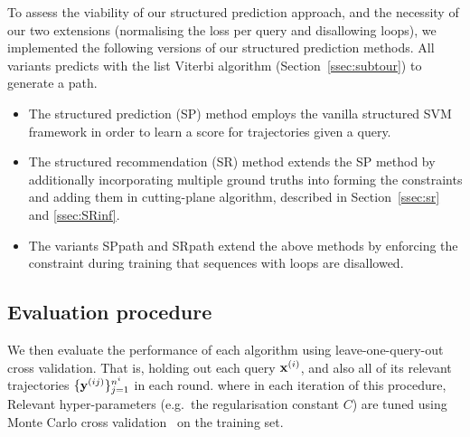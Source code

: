 To assess the viability of our structured prediction approach, and the necessity of our two extensions (normalising the loss per query and disallowing loops), we implemented the following versions of our structured prediction methods.
All variants predicts with the list Viterbi algorithm (Section~\ref{ssec:subtour}) to generate a path.
\begin{itemize}[leftmargin=0.125in]\itemmoveup
\parskip -.05em
	\item The structured prediction ({\sc SP}) method employs the vanilla structured SVM framework in order to learn a score for trajectories given a query.

	\item The structured recommendation ({\sc SR}) method extends the {\sc SP} method by additionally incorporating multiple ground truths into
	forming the constraints and adding them in cutting-plane algorithm,
	described in Section~\ref{ssec:sr} and \ref{ssec:SRinf}.

	\item The variants {\sc SPpath} and {\sc SRpath} extend the above methods by enforcing the constraint during training that sequences with loops are disallowed.
\end{itemize}\itemmoveup


\secmoveup
\subsection{Evaluation procedure}
\textmoveup

We then evaluate the performance of each algorithm using leave-one-query-out cross validation. That is, holding out each query $\mathbf{x}^{({i})}$, and also all of its relevant trajectories $\{\mathbf{y}^{({ij})}\}_{j=1}^{n^i}$ in each round.
where in each iteration of this procedure,
Relevant hyper-parameters (e.g.\ the regularisation constant $C$) are tuned using Monte Carlo cross validation~\cite{burman1989comparative} on the training set.

